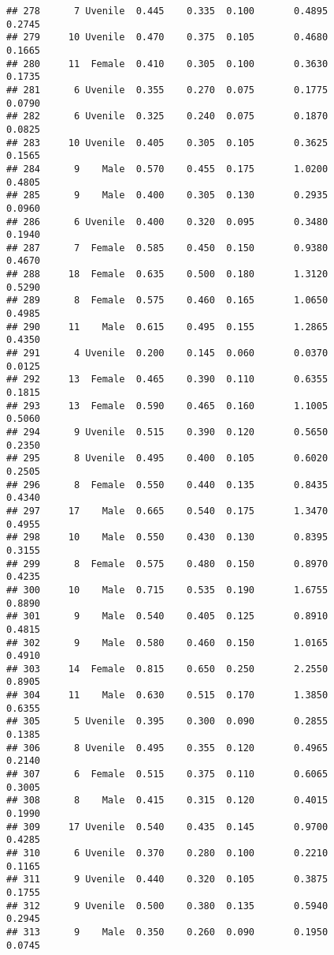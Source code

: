 \documentclass[
]{article}
\begin{document}
\begin{verbatim}
## 278      7 Uvenile  0.445    0.335  0.100       0.4895         0.2745
## 279     10 Uvenile  0.470    0.375  0.105       0.4680         0.1665
## 280     11  Female  0.410    0.305  0.100       0.3630         0.1735
## 281      6 Uvenile  0.355    0.270  0.075       0.1775         0.0790
## 282      6 Uvenile  0.325    0.240  0.075       0.1870         0.0825
## 283     10 Uvenile  0.405    0.305  0.105       0.3625         0.1565
## 284      9    Male  0.570    0.455  0.175       1.0200         0.4805
## 285      9    Male  0.400    0.305  0.130       0.2935         0.0960
## 286      6 Uvenile  0.400    0.320  0.095       0.3480         0.1940
## 287      7  Female  0.585    0.450  0.150       0.9380         0.4670
## 288     18  Female  0.635    0.500  0.180       1.3120         0.5290
## 289      8  Female  0.575    0.460  0.165       1.0650         0.4985
## 290     11    Male  0.615    0.495  0.155       1.2865         0.4350
## 291      4 Uvenile  0.200    0.145  0.060       0.0370         0.0125
## 292     13  Female  0.465    0.390  0.110       0.6355         0.1815
## 293     13  Female  0.590    0.465  0.160       1.1005         0.5060
## 294      9 Uvenile  0.515    0.390  0.120       0.5650         0.2350
## 295      8 Uvenile  0.495    0.400  0.105       0.6020         0.2505
## 296      8  Female  0.550    0.440  0.135       0.8435         0.4340
## 297     17    Male  0.665    0.540  0.175       1.3470         0.4955
## 298     10    Male  0.550    0.430  0.130       0.8395         0.3155
## 299      8  Female  0.575    0.480  0.150       0.8970         0.4235
## 300     10    Male  0.715    0.535  0.190       1.6755         0.8890
## 301      9    Male  0.540    0.405  0.125       0.8910         0.4815
## 302      9    Male  0.580    0.460  0.150       1.0165         0.4910
## 303     14  Female  0.815    0.650  0.250       2.2550         0.8905
## 304     11    Male  0.630    0.515  0.170       1.3850         0.6355
## 305      5 Uvenile  0.395    0.300  0.090       0.2855         0.1385
## 306      8 Uvenile  0.495    0.355  0.120       0.4965         0.2140
## 307      6  Female  0.515    0.375  0.110       0.6065         0.3005
## 308      8    Male  0.415    0.315  0.120       0.4015         0.1990
## 309     17 Uvenile  0.540    0.435  0.145       0.9700         0.4285
## 310      6 Uvenile  0.370    0.280  0.100       0.2210         0.1165
## 311      9 Uvenile  0.440    0.320  0.105       0.3875         0.1755
## 312      9 Uvenile  0.500    0.380  0.135       0.5940         0.2945
## 313      9    Male  0.350    0.260  0.090       0.1950         0.0745

\end{verbatim}
\end{document}
